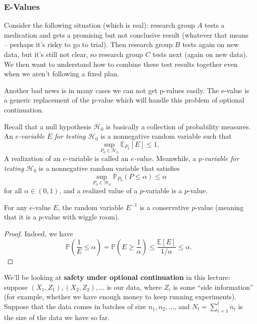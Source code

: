 \subsubsection{E-Values}
\begin{exam}
Consider the following situation (which is real): research group $A$ tests a medication and gets a promising but not conclusive result (whatever that means -- perhaps it's risky to go to trial). Then research group $B$ tests again on new data, but it's still not clear, so research group $C$ tests next (again on new data). We then want to understand how to combine these test results together even when we aren't following a fixed plan.
\end{exam}
Another bad news is in many cases we can not get p-values easily.
The e-value is a generic replacement of the p-value which will handle this problem of optional continuation.

\begin{defn}
Recall that a null hypothesis $\mathcal{H}_0$ is basically a collection of probability measures. An \emph{$e$-variable $E$ for testing $\mathcal{H}_0$} is a nonnegative random variable such that
$$\sup_{P_0 \in \mathcal{H}_0} \mathbb{E}_{P_0}[E] \leq 1.$$
A realization of an $e$-variable is called an \emph{$e$-value}. Meanwhile, a \emph{$p$-variable for testing $\mathcal{H}_0$} is a nonnegative random variable that satisfies
$$\sup_{P_0 \in \mathcal{H}_0} \mathbb{P}_{P_0}(P \leq \alpha) \leq \alpha$$
for all $\alpha \in (0,1)$, and a realized value of a $p$-variable is a $p$-value.
\end{defn}

\begin{prop}
For any $e$-value $E$, the random variable $E^{-1}$ is a conservative $p$-value (meaning that it is a $p$-value with wiggle room).
\end{prop}
\begin{proof}
Indeed, we have
$$\mathbb{P}\left(\frac{1}{E} \leq \alpha\right) = \mathbb{P}\left(E \geq \frac{1}{\alpha}\right) \leq \frac{\mathbb{E}[E]}{1/\alpha} \leq \alpha.$$
\end{proof}

\begin{exam}
We'll be looking at \textbf{safety under optional continuation} in this lecture: suppose $(X_1, Z_1), (X_2, Z_2), \ldots$ is our data, where $Z_i$ is some ``side information'' (for example, whether we have enough money to keep running experiments). Suppose that the data comes in batches of size $n_1, n_2, \ldots$, and $N_t = \sum_{i=1}^{t} n_i$ is the size of the data we have so far.
\end{exam}

